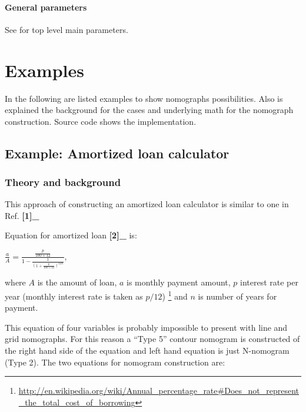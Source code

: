 \documentclass[a4paper,11pt,english]{sphinxmanual}
\begin{document}
\subsubsection{General parameters}
\label{types/types:id75}
See {\hyperref[main_params:id1]{\emph{}}} for top level main parameters.


\chapter{Examples}
\label{examples/examples::doc}\label{examples/examples:examples}
In the following are listed examples to show  nomographs possibilities.  Also is explained the background for the cases
and underlying math for the nomograph construction. Source code shows the implementation.


\section{Example: Amortized loan calculator}
\label{examples/examples:example-amortized-loan-calculator}

\subsection{Theory and background}
\label{examples/examples:theory-and-background}
This approach of constructing an amortized loan calculator is similar to
one in Ref.  {\color{red}\bfseries{}{[}1{]}\_}

Equation for amortized loan  {\color{red}\bfseries{}{[}2{]}\_} is:

\(\frac{a}{A} = \frac{\frac{p}{100\times 12}}{1-\frac{1}{(1+\frac{p}{100\times 12})^{12n}}},\)

where \(A\) is the amount of loan, \(a\) is monthly payment
amount, \(p\) interest rate per year (monthly interest rate is taken
as \(p/12\)) \footnote{
\href{http://en.wikipedia.org/wiki/Annual\_percentage\_rate\#Does\_not\_represent\_the\_total\_cost\_of\_borrowing}{http://en.wikipedia.org/wiki/Annual\_percentage\_rate\#Does\_not\_represent\_the\_total\_cost\_of\_borrowing}
} and \(n\) is number of years for payment.

This equation of four variables is probably impossible to present with
line and grid nomographs. For this reason a ``Type 5'' contour nomogram is
constructed of the right hand side of the equation and left hand
equation is just N-nomogram (Type 2). The two equations for nomogram
construction are:
\end{document}
